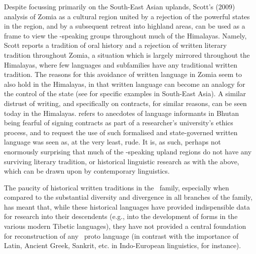 {Despite focussing primarily on the South-East Asian uplands, Scott's (2009) analysis of Zomia as a cultural region united by a rejection of the powerful states in the region, and by a subsequent retreat into highland areas, can be used as a frame to view the \lfam-speaking groups throughout much of the Himalayas. Namely, Scott reports a tradition of oral history and a rejection of written literary tradition throughout Zomia, a situation which is largely mirrored throughout the Himalayas, where few languages and subfamilies have any traditional written tradition. The reasons for this avoidance of written language in Zomia seem to also hold in the Himalayas, in that written language can become an analogy for the control of the state (see  for specific examples in South-East Asia). A similar distrust of writing, and specifically on contracts, for similar reasons, can be seen today in the Himalayas.  refers to anecdotes of language informants in Bhutan being fearful of signing contracts as part of a researcher's university's ethics process, and to request the use of such formalised and state-governed written language was seen as, at the very least, rude.  It is, as such, perhaps not enormously surprising that much of the \lfam-speaking upland regions do not have any surviving literary tradition, or historical linguistic research as with the above, which can be drawn upon by contemporary linguistics.

The paucity of historical written traditions in the \lfam\ family, especially when compared to the substantial diversity and divergence in all branches of the family, has meant that, while these historical languages have provided indispensible data for research into their descendents (e.g., into the development of forms in the various modern Tibetic languages), they have not provided a central foundation for reconstruction of any \lfam\ proto language \cite{STEDT} (in contrast with the importance of Latin, Ancient Greek, Sankrit, etc. in Indo-European linguistics, for instance).

}

